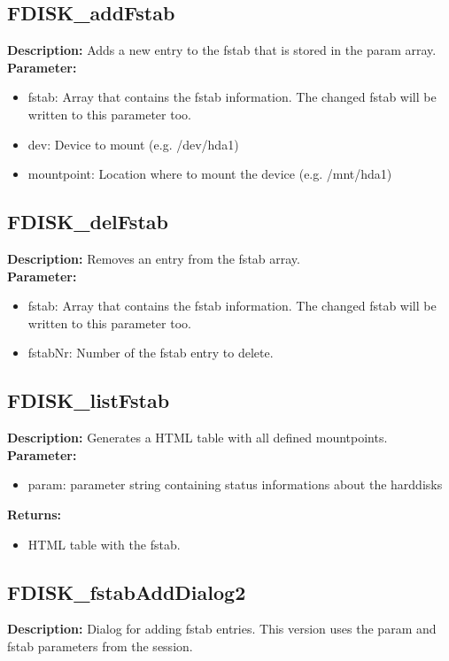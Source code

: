 \subsection{FDISK\_addFstab}
\textbf{Description:} Adds a new entry to the fstab that is stored in the param array.\\
\textbf{Parameter:}
\begin{itemize}
\item fstab: Array that contains the fstab information. The changed fstab will be written to this parameter too.
\item dev: Device to mount (e.g. /dev/hda1)
\item mountpoint: Location where to mount the device (e.g. /mnt/hda1)
\end{itemize}

\subsection{FDISK\_delFstab}
\textbf{Description:} Removes an entry from the fstab array.\\
\textbf{Parameter:}
\begin{itemize}
\item fstab: Array that contains the fstab information. The changed fstab will be written to this parameter too.
\item fstabNr: Number of the fstab entry to delete.
\end{itemize}

\subsection{FDISK\_listFstab}
\textbf{Description:} Generates a HTML table with all defined mountpoints.\\
\textbf{Parameter:}
\begin{itemize}
\item param: parameter string containing status informations about the harddisks
\end{itemize}
\textbf{Returns:}
\begin{itemize}
\item HTML table with the fstab.
\end{itemize}

\subsection{FDISK\_fstabAddDialog2}
\textbf{Description:} Dialog for adding fstab entries. This version uses the param and fstab parameters from the session.\\

